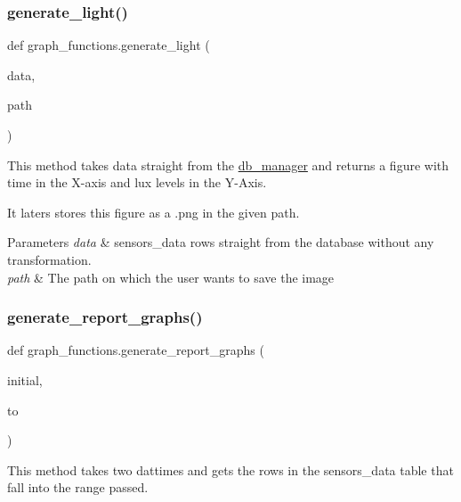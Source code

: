 \subsubsection{\texorpdfstring{generate\+\_\+light()}{generate\_light()}}
{\footnotesize\ttfamily def graph\+\_\+functions.\+generate\+\_\+light (\begin{DoxyParamCaption}\item[{}]{data,  }\item[{}]{path }\end{DoxyParamCaption})}



This method takes data straight from the \textquotesingle{}\hyperlink{namespacedb__manager}{db\+\_\+manager}\textquotesingle{} and returns a figure with time in the X-\/axis and lux levels in the Y-\/\+Axis. 

It laters stores this figure as a .png in the given path. 
\begin{DoxyParams}{Parameters}
{\em data} & \textquotesingle{}sensors\+\_\+data\textquotesingle{} rows straight from the database without any transformation. \\
\hline
{\em path} & The path on which the user wants to save the image \\
\hline
\end{DoxyParams}
\mbox{\label{namespacegraph__functions_a96b23c65bf5aeb2997f22e3972c9f4d1}} 
\subsubsection{\texorpdfstring{generate\+\_\+report\+\_\+graphs()}{generate\_report\_graphs()}}
{\footnotesize\ttfamily def graph\+\_\+functions.\+generate\+\_\+report\+\_\+graphs (\begin{DoxyParamCaption}\item[{}]{initial,  }\item[{}]{to }\end{DoxyParamCaption})}



This method takes two dattimes and gets the rows in the \textquotesingle{}sensors\+\_\+data\textquotesingle{} table that fall into the range passed. 

